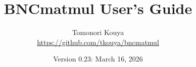 \documentclass[a4j,report,english]{jsbook}
\newif\ifJP \JPfalse   %
\newcommand{\bi}[2]{\ifJP #2\else #1\fi}
\begin{document}
\title{\bi{BNCmatmul User's Guide}{BNCmatmul ユーザーズガイド}}
\author{Tomonori Kouya\\\url{https://github.com/tkouya/bncmatmul}}
\date{Version 0.23: March 16, 2026}

\maketitle

\frontmatter

\tableofcontents

\mainmatter

















\end{document}
